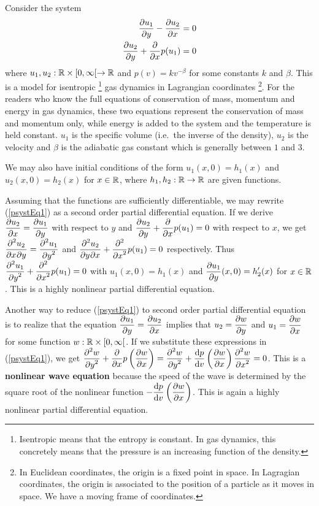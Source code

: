 \begin{egg}   \label{eggPsystem}
Consider the system
\begin{equation} \label{psystEq1}
\begin{split}
\pdydx{u_1}{y} - \pdydx{u_2}{x} &= 0 \\
\pdydx{u_2}{y} + \pdfdx{p(u_1)}{x} &= 0
\end{split}
\end{equation}
where $u_1,u_2: \RR\times[0,\infty[ \to \RR$ and
$\displaystyle p(v) = kv^{-\beta}$ for some constants $k$ and
$\beta$.  This is a model for isentropic \footnote{Isentropic means that the
entropy is constant.  In gas dynamics, this concretely means that the
pressure is an increasing function of the density.} gas dynamics in
Lagrangian coordinates \footnote{In Euclidean coordinates, the origin
is a fixed point in space.  In Lagragian coordinates, the origin is
associated to the position of a particle as it moves in space.  We
have a moving frame of coordinates.}.
For the readers who know the full equations of conservation
of mass, momentum and energy in gas dynamics, these two equations
represent the conservation of mass and momentum only, while energy is added
to the system and the temperature is held constant.
$u_1$ is the specific volume (i.e.\ the inverse of the density),
$u_2$ is the velocity and $\beta$ is the adiabatic gas constant which is
generally between $1$ and $3$.

We may also have initial conditions of the form
$u_1(x,0) = h_1(x)$ and $u_2(x,0) = h_2(x)$ for $x \in\RR$, where
$h_1,h_2:\RR\to\RR$ are given functions.

Assuming that the functions are sufficiently differentiable, we may
rewrite (\ref{psystEq1}) as a second order partial differential
equation.  If we derive $\displaystyle \pdydx{u_2}{x} = \pdydx{u_1}{y}$
with respect to $y$ and
$\displaystyle \pdydx{u_2}{y} + \pdfdx{p(u_1)}{x} = 0$ with respect to
$x$, we get $\displaystyle \pdydxnm{u_2}{x}{y}{2}{}{} = \pdydxn{u_1}{y}{2}$
and
$\displaystyle \pdydxnm{u_2}{y}{x}{2}{}{} + \pdfdxn{p(u_1)}{x}{2} = 0$
respectively.  Thus
$\displaystyle \pdydxn{u_1}{y}{2} + \pdfdxn{p(u_1)}{x}{2} = 0$ with
$u_1(x,0) = h_1(x)$ and $\displaystyle \pdydx{u_1}{y}(x,0) = h_2'(x)$ for
$x\in \RR$.  This is a highly nonlinear partial differential equation.

Another way to reduce (\ref{psystEq1}) to second order partial differential
equation is to realize that the equation
$\displaystyle \pdydx{u_1}{y} = \pdydx{u_2}{x}$ implies that
$\displaystyle u_2 = \pdydx{w}{y}$ and
$\displaystyle u_1 = \pdydx{w}{x}$ for some function $w:\RR\times [0,\infty[$.
If we substitute these expressions in (\ref{psystEq1}), we get
$\displaystyle \pdydxn{w}{y}{2} +
\pdfdx{p\left(\pdydx{w}{x}\right)}{x}
= \pdydxn{w}{y}{2} + \dydx{p}{v}\left(\pdydx{w}{x}\right)
\pdydxn{w}{x}{2} = 0$.
This is a {\bfseries nonlinear wave equation}
because the speed of the wave is determined by the square root of the
nonlinear function $\displaystyle -\dydx{p}{v}\left(\pdydx{w}{x}\right)$.
This is again a highly nonlinear partial differential equation.


\end{egg}
